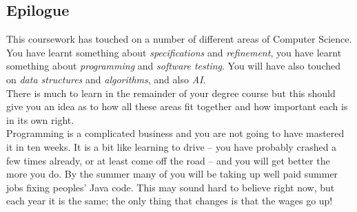 \subsection{Epilogue}

This coursework has touched on a number of different areas of Computer 
Science. You have learnt something about {\em specifications} and {\em 
refinement}, you have learnt something about {\em programming} and 
{\em software testing}. You will have also touched on {\em data structures}
and {\em algorithms}, and also {\em AI}. \\

\noindent
There is much to learn in the remainder of your degree course but this 
should give you an idea as to how all these areas fit together and how 
important each is in its own right. \\

\noindent
Programming is a complicated business and you are not going to have mastered 
it in ten weeks. It is a bit like learning to drive -- you have probably 
crashed a few times already, or at least come off the road -- and you 
will get better the more you do. By the summer many of you will be taking 
up well paid summer jobs fixing peoples' Java code. This may sound hard to 
believe right now, but each year it is the same; the only thing that 
changes is that the wages go up!
